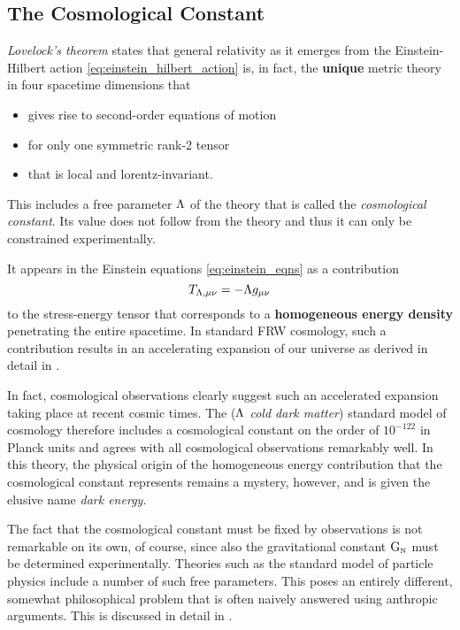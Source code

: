 \documentclass[parskip=half]{scrreprt}
\begin{document}
\subsection{The Cosmological Constant}\label{sec:cc_intro}

\emph{Lovelock's theorem}\label{sec:lovelock} states that general relativity as it emerges from the Einstein-Hilbert action \ref{eq:einstein_hilbert_action} is, in fact, the \textbf{unique} metric theory in four spacetime dimensions that 
\begin{itemize}
	\item gives rise to second-order equations of motion
	\item for only one symmetric rank-2 tensor
	\item that is local and lorentz-invariant.
\end{itemize}
This includes a free parameter \(\Lambda\) of the theory that is called the \emph{cosmological constant}. Its value does not follow from the theory and thus it can only be constrained experimentally.

It appears in the Einstein equations \ref{eq:einstein_eqns} as a contribution
\begin{equation}
	T_{\Lambda\textnormal{,}\mu\nu} = - \Lambda g_{\mu\nu}
\end{equation}
to the stress-energy tensor that corresponds to a \textbf{homogeneous energy density} penetrating the entire spacetime. In standard FRW cosmology, such a contribution results in an accelerating expansion of our universe as derived in detail in .

In fact, cosmological observations clearly suggest such an accelerated expansion taking place at recent cosmic times.  The \LCDM (\emph{\(\Lambda\) cold dark matter}) standard model of cosmology therefore includes a cosmological constant on the order of \(10^{-122}\) in Planck units and agrees with all  cosmological observations remarkably well. In this theory, the physical origin of the homogeneous energy contribution that the cosmological constant represents remains a mystery, however, and is given the elusive  name \emph{dark energy}. 

The fact that the cosmological constant must be fixed by observations is not remarkable on its own, of course, since also the gravitational constant \(\mathrm{G}_\textnormal{\tiny{N}}\) must be determined experimentally. Theories such as the standard model of particle physics include a number of such free parameters. This poses an entirely different, somewhat philosophical problem that is often naively answered using anthropic arguments. This is discussed in detail in .
\end{document}
